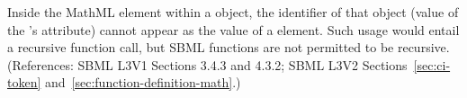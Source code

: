 Inside the  MathML element within a \FunctionDefinition
object, the identifier of that object (\ie value of the
\FunctionDefinition's  attribute) cannot appear as the value of a
 element.  Such usage would entail a recursive function call, but
SBML functions are not permitted to be recursive.  (References: SBML L3V1 Sections 3.4.3 and 4.3.2; SBML L3V2
Sections~\ref{sec:ci-token} and~\ref{sec:function-definition-math}.)
